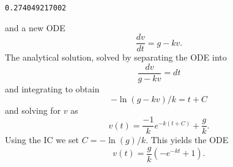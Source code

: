 \documentclass[letterpaper,10pt,english]{/Library/Python/2.7/site-packages/Sphinx-1.2-py2.7.egg/sphinx/texinputs/sphinxhowto}
\newenvironment{InvisibleVerbatim}
        {\begin{mdframed}[leftmargin=0.1\linewidth,innerleftmargin=3pt,innerrightmargin=3pt, userdefinedwidth=1\linewidth, linewidth=0pt, linecolor=white, usetwoside=false]}
        {\end{mdframed}}
\begin{document}
    

        
        

            
                \begin{InvisibleVerbatim}
                \vspace{-0.5\baselineskip}
\begin{alltt}0.274049217002
\end{alltt}

            \end{InvisibleVerbatim}
            
        
    
and a new ODE \[ \frac{dv}{dt} = g - k v .\] The analytical solution,
solved by separating the ODE into \[ \frac{dv}{g-kv} = dt \] and
integrating to obtain \[ -\ln (g-kv)/k = t+C \] and solving for $v$ as
\[ v(t) = \frac{-1}{k}e^{-k(t+C)} + \frac{g}{k}. \] Using the IC we set
$C = -\ln (g) / k$. This yields the ODE
\[ v(t) = \frac{g}{k}\left ( -e^{-kt} + 1 \right ). \]

\end{document}
